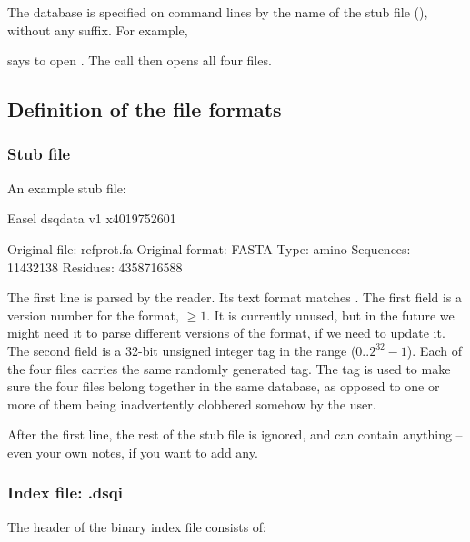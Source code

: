 The database is specified on command lines by the name of the stub
file (), without any suffix. For example,

\begin{userchunk} 
\end{userchunk}

says to open . The  call then
opens all four files.


\subsection{Definition of the  file formats}

\subsubsection{Stub file}

An example stub file:

\begin{cchunk}
Easel dsqdata v1 x4019752601

Original file:   refprot.fa
Original format: FASTA
Type:            amino
Sequences:       11432138
Residues:        4358716588
\end{cchunk}

The first line is parsed by the reader. Its text format matches
.
The first field is a version number for the format, $\geq 1$. It is
currently unused, but in the future we might need it to parse
different versions of the format, if we need to update it. The second
field is a 32-bit unsigned integer tag in the range
(0..$2^{32}-1$). Each of the four files carries the same randomly
generated tag. The tag is used to make sure the four files belong
together in the same database, as opposed to one or more of them being
inadvertently clobbered somehow by the user.

After the first line, the rest of the stub file is ignored, and can
contain anything -- even your own notes, if you want to add any.

\subsubsection{Index file: .dsqi}

The header of the binary index file consists of:

